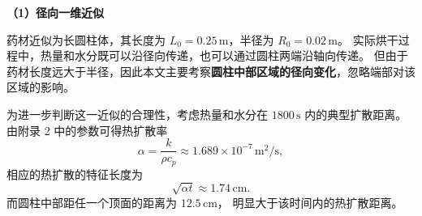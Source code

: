 




\noindent\textbf{（1）径向一维近似}

药材近似为长圆柱体，其长度为 $L_0=0.25\,\mathrm{m}$，半径为 $R_0=0.02\,\mathrm{m}$。
实际烘干过程中，热量和水分既可以沿径向传递，也可以通过圆柱两端沿轴向传递。
但由于药材长度远大于半径，因此本文主要考察\textbf{圆柱中部区域的径向变化}，忽略端部对该区域的影响。

为进一步判断这一近似的合理性，考虑热量和水分在 $1800\,\mathrm{s}$ 内的典型扩散距离。
由附录 2 中的参数可得热扩散率
\[
\alpha=\frac{k}{\rho c_p}
\approx1.689\times10^{-7}\,\mathrm{m^2/s},
\]
相应的热扩散的特征长度为
\[
\sqrt{\alpha t}\approx1.74\,\mathrm{cm}.
\]
而圆柱中部距任一个顶面的距离为 $12.5\,\mathrm{cm}$，
明显大于该时间内的热扩散距离。

